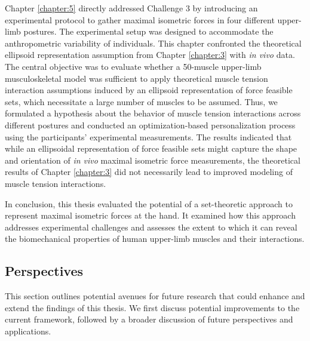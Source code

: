 Chapter \ref{chapter:5} directly addressed Challenge 3 by introducing an experimental protocol to gather maximal isometric forces in four different upper-limb postures. The experimental setup was designed to accommodate the anthropometric variability of individuals. This chapter confronted the theoretical ellipsoid representation assumption from Chapter \ref{chapter:3} with \emph{in vivo} data. The central objective was to evaluate whether a 50-muscle upper-limb musculoskeletal model was sufficient to apply theoretical muscle tension interaction assumptions induced by an ellipsoid representation of force feasible sets, which necessitate a large number of muscles to be assumed. Thus, we formulated a hypothesis about the behavior of muscle tension interactions across different postures and conducted an optimization-based personalization process using the participants' experimental measurements. The results indicated that while an ellipsoidal representation of force feasible sets might capture the shape and orientation of \emph{in vivo} maximal isometric force measurements, the theoretical results of Chapter \ref{chapter:3} did not necessarily lead to improved modeling of muscle tension interactions. 

In conclusion, this thesis evaluated the potential of a set-theoretic approach to represent maximal isometric forces at the hand. It examined how this approach addresses experimental challenges and assesses the extent to which it can reveal the biomechanical properties of human upper-limb muscles and their interactions.



\subsection*{Perspectives}

This section outlines potential avenues for future research that could enhance and extend the findings of this thesis. We first discuss potential improvements to the current framework, followed by a broader discussion of future perspectives and applications.

